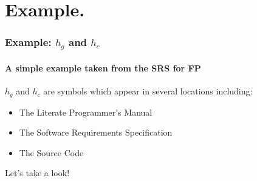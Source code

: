 \documentclass{beamer}
\newcounter{datadefnum} %
\newcommand{\colAwidth}{0.2\textwidth}
\newcommand{\colBwidth}{0.73\textwidth}
\begin{document}

\section[Example]{Example.}


\begin{frame}

\frametitle{Example: $h_g$ and $h_c$}

\framesubtitle{A simple example taken from the SRS for FP}

$h_g$ and $h_c$ are symbols which appear in several locations including:
\begin{itemize}
\item The Literate Programmer's Manual
\item The Software Requirements Specification
\item The Source Code
\end{itemize}

Let's take a look!

\end{frame}


%
%
%
%
\end{document}
